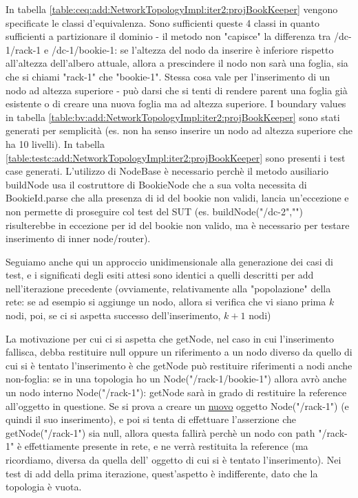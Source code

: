 \documentclass[10pt, a4paper]{article}
\newcommand{\gettablelabel}[5]{table:#1:#2:#3:iter#4:proj#5}
\def\bookkeeper{BookKeeper}
\begin{document}
	In tabella \ref{\gettablelabel{ceq}{add}{NetworkTopologyImpl}{2}{\bookkeeper}} vengono specificate le
	classi d'equivalenza. Sono sufficienti queste 4 classi in quanto sufficienti a partizionare il dominio -
	il metodo non "capisce" la differenza tra /dc-1/rack-1 e /dc-1/bookie-1: se l'altezza del nodo da inserire
	è inferiore rispetto all'altezza dell'albero attuale, allora a prescindere il nodo non sarà una foglia, sia
	che si chiami "rack-1" che "bookie-1". Stessa cosa vale per l'inserimento di un nodo ad altezza superiore -
	può darsi che si tenti di rendere parent una foglia già esistente o di creare una nuova foglia ma ad altezza
	superiore. I boundary values in tabella \ref{\gettablelabel{bv}{add}{NetworkTopologyImpl}{2}{\bookkeeper}}
	sono stati generati per semplicità (es. non ha senso inserire un nodo ad altezza superiore che ha 10 livelli). In tabella \ref{\gettablelabel{testc}{add}{NetworkTopologyImpl}{2}{\bookkeeper}} sono presenti i test
	case generati. L'utilizzo di NodeBase è necessario perchè il metodo ausiliario buildNode usa il costruttore di
	BookieNode che a sua volta necessita di BookieId.parse che alla presenza di id del bookie non validi, lancia
	un'eccezione e non permette di proseguire col test del SUT (es. buildNode("/dc-2","") risulterebbe in eccezione per id del bookie non valido, ma è necessario per testare inserimento di inner node/router).
	
	Seguiamo anche qui un approccio unidimensionale alla generazione dei casi di test, e i significati
	degli esiti attesi sono identici a quelli descritti per add nell'iterazione precedente (ovviamente,
	relativamente alla "popolazione" della rete: se ad esempio si aggiunge un nodo, allora si verifica che
	vi siano prima $k$ nodi, poi, se ci si aspetta successo dell'inserimento, $k+1$ nodi)
	
	La motivazione per cui ci si aspetta che getNode, nel caso in cui l'inserimento fallisca, debba restituire
	null oppure un riferimento a un nodo diverso da quello di cui si è tentato l'inserimento è che getNode
	può restituire riferimenti a nodi anche non-foglia: se in una topologia ho un Node("/rack-1/bookie-1") allora
	avrò anche un nodo interno Node("/rack-1"): getNode sarà in grado di restituire la reference all'oggetto
	in questione. Se si prova a creare un \underline{nuovo} oggetto Node("/rack-1") (e quindi il suo inserimento),
	 e poi si tenta di effettuare
	l'asserzione che getNode("/rack-1") sia null, allora questa fallirà perchè un nodo con path "/rack-1" è
	effettiamente presente in rete, e ne verrà restituita la reference (ma ricordiamo, diversa da quella dell'
	oggetto di cui si è tentato l'inserimento). Nei test di add della prima iterazione, quest'aspetto è 
	indifferente, dato che la topologia è vuota.
	
\end{document}

